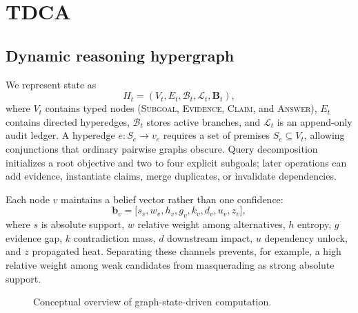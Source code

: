 \section{TDCA}
\label{sec:method}

\subsection{Dynamic reasoning hypergraph}
We represent state as
\begin{equation}
H_t=(V_t,E_t,\mathcal{B}_t,\mathcal{L}_t,\mathbf{B}_t),
\end{equation}
where $V_t$ contains typed nodes (\textsc{Subgoal}, \textsc{Evidence}, \textsc{Claim}, and \textsc{Answer}), $E_t$ contains directed hyperedges, $\mathcal{B}_t$ stores active branches, and $\mathcal{L}_t$ is an append-only audit ledger. A hyperedge $e:S_e\rightarrow v_e$ requires a set of premises $S_e\subseteq V_t$, allowing conjunctions that ordinary pairwise graphs obscure. Query decomposition initializes a root objective and two to four explicit subgoals; later operations can add evidence, instantiate claims, merge duplicates, or invalidate dependencies.

Each node $v$ maintains a belief vector rather than one confidence:
\begin{equation}
\mathbf{b}_v=\big[s_v,w_v,h_v,g_v,k_v,d_v,u_v,z_v\big],
\end{equation}
where $s$ is absolute support, $w$ relative weight among alternatives, $h$ entropy, $g$ evidence gap, $k$ contradiction mass, $d$ downstream impact, $u$ dependency unlock, and $z$ propagated heat. Separating these channels prevents, for example, a high relative weight among weak candidates from masquerading as strong absolute support.

\begin{figure}[t]
\centering
{}
\caption{Conceptual overview of graph-state-driven computation.}
\label{fig:overview}
\end{figure}

